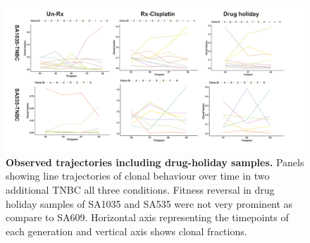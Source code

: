 \begin{figure}
\centering
\includegraphics[width=\textwidth]{Figures/drugholidaysamples.pdf}
	
\caption[TNBC-SA609 PDX reproducible clonal dynamics with and without treatment]
	{\small
\textbf{Observed trajectories including drug-holiday samples.}
Panels showing line trajectories of clonal behaviour over time in two additional TNBC all three conditions. Fitness reversal in drug holiday samples of SA1035 and SA535 were not very prominent as compare to SA609. Horizontal axis representing the timepoints of each generation and vertical axis shows clonal fractions.
	}
	\label{fig:drugholidaysamples}
\end{figure}



